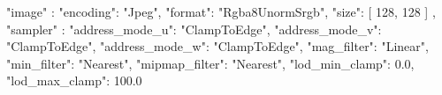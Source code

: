 {
    "image" : {
        "encoding": "Jpeg",
        "format": "Rgba8UnormSrgb",
        "size": [
            128,
            128
        ]
    },
    "sampler" : {
        "address_mode_u": "ClampToEdge",
        "address_mode_v": "ClampToEdge",
        "address_mode_w": "ClampToEdge",
        "mag_filter": "Linear",
        "min_filter": "Nearest",
        "mipmap_filter": "Nearest",
        "lod_min_clamp": 0.0,
        "lod_max_clamp": 100.0
    }
}
